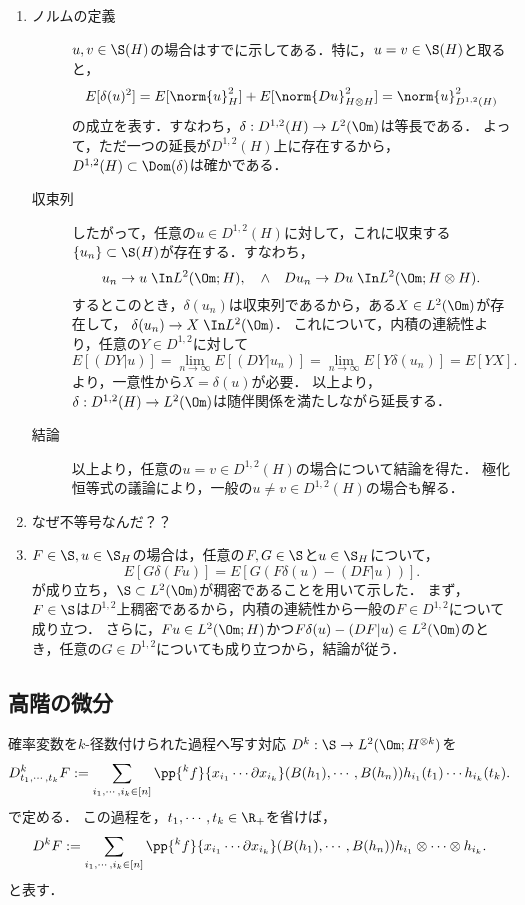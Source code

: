 \documentclass[uplatex,dvipdfmx]{jsreport}
\begin{document}
\begin{Proof}\mbox{}
    \begin{enumerate}
        \item \begin{description}
            \item[ノルムの定義] $u,v\in\S(H)$の場合はすでに示してある．特に，$u=v\in\S(H)$と取ると，
            \[E[\delta(u)^2]=E[\norm{u}^2_H]+E[\norm{Du}^2_{H\otimes H}]=\norm{u}^2_{D^{1,2}(H)}\]
            の成立を表す．すなわち，$\delta:D^{1,2}(H)\to L^2(\Om)$は等長である．
            よって，ただ一つの延長が$D^{1,2}(H)$上に存在するから，$D^{1,2}(H)\subset\Dom(\delta)$は確かである．
            \item[収束列] したがって，任意の$u\in D^{1,2}(H)$に対して，これに収束する$\{u_n\}\subset\S(H)$が存在する．すなわち，\[u_n\to u\;\In L^2(\Om;H),\quad\land\quad Du_n\to Du\;\In L^2(\Om;H\otimes H).\]
            するとこのとき，$\delta(u_n)$は収束列であるから，ある$X\in L^2(\Om)$が存在して，
            $\delta(u_n)\to X\;\In L^2(\Om)$．
            これについて，内積の連続性より，任意の$Y\in D^{1,2}$に対して
            \[E[(DY|u)]=\lim_{n\to\infty}E[(DY|u_n)]=\lim_{n\to\infty}E[Y\delta(u_n)]=E[YX].\]
            より，一意性から$X=\delta(u)$が必要．
            以上より，$\delta:D^{1,2}(H)\to L^2(\Om)$は随伴関係を満たしながら延長する．
            \item[結論] 以上より，任意の$u=v\in D^{1,2}(H)$の場合について結論を得た．
            極化恒等式の議論により，一般の$u\ne v\in D^{1,2}(H)$の場合も解る．
        \end{description}
        \item なぜ不等号なんだ？？
        \item $F\in\S,u\in\S_H$の場合は，任意の$F,G\in\S$と$u\in\S_H$について，
        \[E[G\delta(Fu)]=E[G(F\delta(u)-(DF|u))].\]
        が成り立ち，$\S\subset L^2(\Om)$が稠密であることを用いて示した．
        まず，$F\in\S$は$D^{1,2}$上稠密であるから，内積の連続性から一般の$F\in D^{1,2}$について成り立つ．
        さらに，$Fu\in L^2(\Om;H)$かつ$F\delta(u)-(DF|u)\in L^2(\Om)$のとき，任意の$G\in D^{1,2}$についても成り立つから，結論が従う．
    \end{enumerate}
\end{Proof}

\subsection{高階の微分}

\begin{definition}
    確率変数を$k$-径数付けられた過程へ写す対応
    $D^k:\S\to L^2(\Om;H^{\otimes k})$を
    \[D^k_{t_1,\cdots,t_k}F:=\sum_{i_1,\cdots,i_k\in[n]}\pp{^kf}{x_{i_1}\cdots\partial x_{i_k}}(B(h_1),\cdots,B(h_n))h_{i_1}(t_1)\cdots h_{i_k}(t_k).\]
    で定める．
    この過程を，$t_1,\cdots,t_k\in\R_+$を省けば，
    \[D^kF:=\sum_{i_1,\cdots,i_k\in[n]}\pp{^kf}{x_{i_1}\cdots\partial x_{i_k}}(B(h_1),\cdots,B(h_n))h_{i_1}\otimes\cdots\otimes h_{i_k}.\]
    と表す．
\end{definition}
\end{document}
